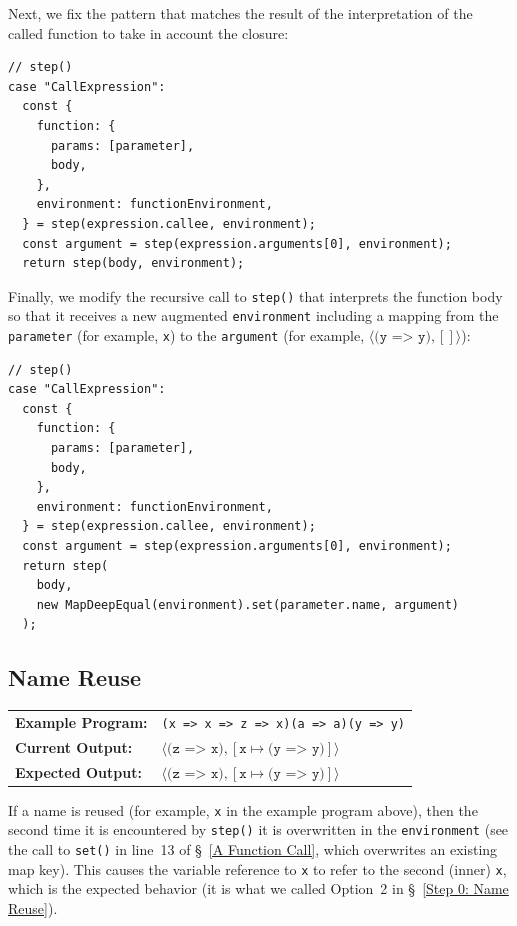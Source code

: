 \documentclass[12pt, oneside]{book}
\begin{document}
Next, we fix the pattern that matches the result of the interpretation of the called function to take in account the closure:

\begin{verbatim}
// step()
case "CallExpression":
  const {
    function: {
      params: [parameter],
      body,
    },
    environment: functionEnvironment,
  } = step(expression.callee, environment);
  const argument = step(expression.arguments[0], environment);
  return step(body, environment);
\end{verbatim}

Finally, we modify the recursive call to \texttt{step()} that interprets the function body so that it receives a new augmented \texttt{environment} including a mapping from the \texttt{parameter} (for example, \texttt{x}) to the \texttt{argument} (for example, $\langle \texttt{(y => y)}, [] \rangle$):

\begin{verbatim}
// step()
case "CallExpression":
  const {
    function: {
      params: [parameter],
      body,
    },
    environment: functionEnvironment,
  } = step(expression.callee, environment);
  const argument = step(expression.arguments[0], environment);
  return step(
    body,
    new MapDeepEqual(environment).set(parameter.name, argument)
  );
\end{verbatim}

\subsection{Name Reuse}

\begin{center}
\begin{tabular}{ll}
\textbf{Example Program:} & \texttt{(x => x => z => x)(a => a)(y => y)} \\
\textbf{Current Output:} & $\langle \texttt{(z => x)}, [\texttt{x} \mapsto \texttt{(y => y)}] \rangle$ \\
\textbf{Expected Output:} & $\langle \texttt{(z => x)}, [\texttt{x} \mapsto \texttt{(y => y)}] \rangle$ \\
\end{tabular}
\end{center}

If a name is reused (for example, \texttt{x} in the example program above), then the second time it is encountered by \texttt{step()} it is overwritten in the \texttt{environment} (see the call to \texttt{set()} in line~13 of §~\ref{A Function Call}, which overwrites an existing map key). This causes the variable reference to \texttt{x} to refer to the second (inner) \texttt{x}, which is the expected behavior (it is what we called Option~2 in §~\ref{Step 0: Name Reuse}).
\end{document}
